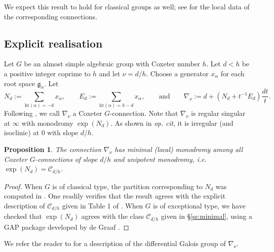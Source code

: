 \documentclass[11pt]{amsart}
\newtheorem{prop}[thm]{Proposition}
\theoremstyle{definition}
\newcommand{\cC}{\mathcal{C}}
\newcommand{\fg}{\mathfrak{g}}
\begin{document}
We expect this result to hold for classical groups as well; see  \cite[Table 11]{JY} for the local data of the corresponding connections.



\subsection{Explicit realisation} \label{ss:Explicit}
Let $G$ be an almost simple algebraic group with Coxeter number $h$. Let $d<h$ be a positive integer coprime to $h$ and let $\nu=d/h$.  Choose a generator $x_\alpha$ for each root space $\fg_\alpha$. 
Let 
\[
N_d :=\sum_{\mathrm{ht}(\alpha)=-d}  x_\alpha, \qquad  E_d:= \sum_{\mathrm{ht}(\alpha)=h-d} x_\alpha,\qquad \text{and}\qquad 
\nabla_\nu:= d+ (N_d+t^{-1} E_d)\frac{dt}{t}. 
\]
Following \cite{KS-rigid}, we call $\nabla_\nu$ a Coxeter $G$-connection. Note that $\nabla_\nu$ is regular singular at $\infty$ with monodromy $\exp(N_d)$. As shown in \emph{op. cit}, it is irregular (and isoclinic) at $0$ with slope $d/h$. 



\begin{prop} The connection $\nabla_\nu$ has minimal (local) monodromy among all Coxeter $G$-connections of slope $d/h$ and unipotent monodromy, i.e. $\exp(N_d)=\cC_{d/h}$. 
\end{prop} 

\begin{proof}
 When $G$ is of classical type, the partition corresponding to $N_d$ was computed in \cite[\S 4.3]{KS-rigid}. One readily verifies that the result agrees with the explicit description of $\cC_{d/h}$ given in Table 1 of \cite{JY}. 
When $G$ is of exceptional type, we have checked that $\exp(N_d)$ agrees with the class $\cC_{d/h}$ given in \S \ref{ss:minimal}, using a GAP package developed by de Graaf \cite{dG}. 
\end{proof} 


We refer the reader to \cite{KS-galois} for a description of the differential Galois group of $\nabla_\nu$. 











\fontsize{10}{12}\selectfont
\end{document}
